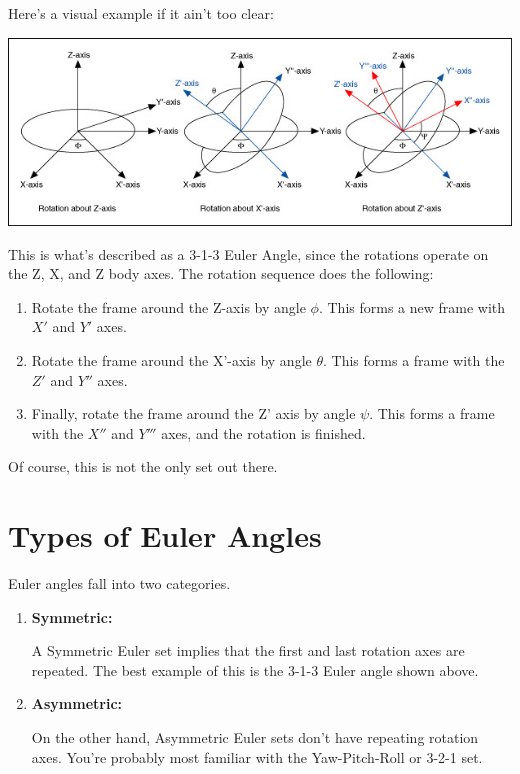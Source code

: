 \documentclass[a4paper,14pt]{extreport}
\begin{document}
Here's a visual example if it ain't too clear:

\begin{center}
\includegraphics[width=16cm]{euler_proper}
\end{center}

This is what's described as a 3-1-3 Euler Angle, since the rotations operate on the Z, X, and Z body axes. The rotation sequence does the following:
\begin{enumerate}
\item Rotate the frame around the Z-axis by angle $\phi$. This forms a new frame with $X'$ and $Y'$ axes.
\item Rotate the frame around the X'-axis by angle $\theta$. This forms a frame with the $Z'$ and $Y''$ axes.
\item Finally, rotate the frame around the Z' axis by angle $\psi$. This forms a frame with the $X''$ and $Y'''$ axes, and the rotation is finished.
\end{enumerate}

Of course, this is not the only set out there.

\section{Types of Euler Angles}
Euler angles fall into two categories.

\begin{enumerate}
\item{\textbf{Symmetric:}

A Symmetric Euler set implies that the first and last rotation axes are repeated. The best example of this is the 3-1-3 Euler angle shown above.}

\item{\textbf{Asymmetric:}

On the other hand, Asymmetric Euler sets don't have repeating rotation axes. You're probably most familiar with the Yaw-Pitch-Roll or 3-2-1 set.}
\end{enumerate}
\end{document}
